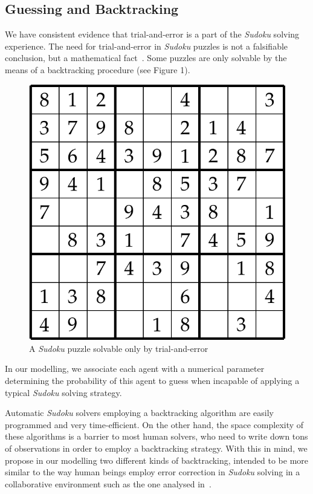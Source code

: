 \documentclass[letterpaper]{article}
\begin{document}
\subsection{Guessing and Backtracking}

We have consistent evidence that trial-and-error is a part of the {\em Sudoku} solving experience. The need for trial-and-error in {\em Sudoku} puzzles is not a falsifiable conclusion, but a mathematical fact~\cite{davis:mathsudoku}. Some puzzles are only solvable by the means of a backtracking procedure (see Figure 1).

\begin{figure}
\centering
\includegraphics[scale=0.30]{trial_and_error_sudoku}
\caption{A {\em Sudoku} puzzle solvable only by trial-and-error}
\label{fig:trial_and_error_sudoku}
\end{figure}

In our modelling, we associate each agent with a numerical parameter determining the probability of this agent to guess when incapable of applying a typical {\em Sudoku} solving strategy.

Automatic {\em Sudoku} solvers employing a backtracking algorithm are easily programmed and very time-efficient. On the other hand, the space complexity of these algorithms is a barrier to most human solvers, who need to write down tons of observations in order to employ a backtracking strategy. With this in mind, we propose in our modelling two different kinds of backtracking, intended to be more similar to the way human beings employ error correction in {\em Sudoku} solving in a collaborative environment such as the one analysed in~\cite{farenzena:collabem}.
\end{document}
